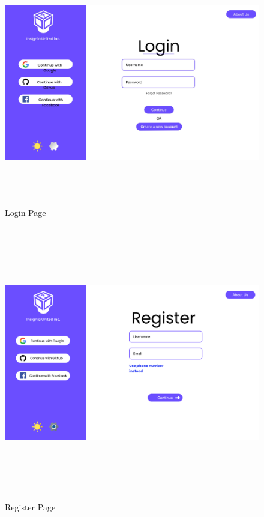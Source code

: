 \begin{figure}[H]
    \centering
\includegraphics[height=10cm, width=1\textwidth]{./images/prototype/0001}
 \caption{Login Page}
\label{fig:prototype1} 

\includegraphics[height=12cm, width=1\textwidth]{./images/prototype/Group 45}
\centering 
\caption{Register Page}
\label{fig:prototype1}
\end{figure}

